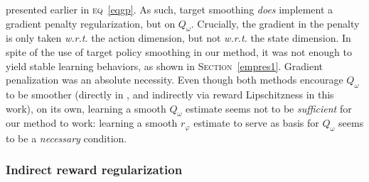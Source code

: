 presented earlier in \textsc{eq}~\ref{eqgp}.
As such, target smoothing \emph{does} implement a gradient penalty regularization,
but on $Q_\omega$.
Crucially, the gradient in the penalty is only taken
\textit{w.r.t.} the action dimension, but not \textit{w.r.t.} the state dimension.
In spite of the use of target policy smoothing in our method,
it was not enough to yield stable learning behaviors,
as shown in \textsc{Section}~\ref{empres1}.
Gradient penalization was an absolute necessity.
Even though both methods encourage $Q_\omega$ to
be smoother (directly in \cite{Fujimoto2018-pe},
and indirectly via reward Lipschitzness in this work),
on its own, learning a smooth $Q_\omega$ estimate seems not to be \emph{sufficient}
for our method to work:
learning a smooth $r_\varphi$ estimate to serve as basis for $Q_\omega$
seems to be a \emph{necessary} condition.

\subsubsection{Indirect reward regularization}
\label{indirectreg}

